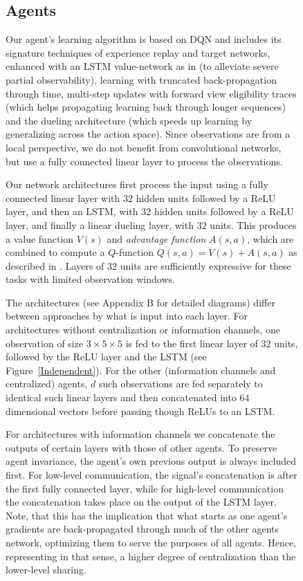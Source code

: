 \documentclass{article}
\begin{document}
\begin{figure}
\subsection{Agents}
Our agent's learning algorithm is based on DQN \citep{dqn15} and includes its signature techniques of experience replay and target networks, enhanced with an LSTM value-network as in \citet{HausknechtStoneRecurrent} (to alleviate severe partial observability), learning with truncated back-propagation through time, multi-step updates with forward view eligibility traces \citep{HarbPrecupRecurrance} (which helps propagating learning back through longer sequences) and the dueling architecture \citep{WangDuelling} (which speeds up learning by generalizing across the action space). Since observations are from a local perspective, we do not benefit from convolutional networks, but use a fully connected linear layer to process the observations. 

Our network architectures first process the input using a fully connected linear layer with $32$ hidden units followed by a ReLU layer, and then an LSTM, with $32$ hidden units followed by a ReLU layer, and finally a linear dueling layer, with $32$ units. This produces a value function $V(s)$ and \emph{advantage function} $A(s,a)$, which are combined to compute a $Q$-function $Q(s,a) = V(s) + A(s,a)$ as described in \citet{WangDuelling}. Layers of $32$ units are sufficiently expressive for these tasks with limited observation windows.

The architectures (see Appendix B for detailed diagrams) differ between approaches by what is input into each layer. For architectures without centralization or information channels, one observation of size $3\times 5\times 5$ is fed to the first linear layer of $32$ units, followed by the ReLU layer and the LSTM (see Figure~\ref{Independent}). For the other (information channels and centralized) agents, $d$ such observations are fed separately to identical such linear layers and then concatenated into $64$ dimensional vectors before passing though ReLUs to an LSTM. 

For architectures with information channels we concatenate the outputs of certain layers with those of other agents. To preserve agent invariance, the agent's own previous output is always included first. For low-level communication, the signal's concatenation is after the first fully connected layer, while for high-level communication the concatenation takes place on the output of the LSTM layer. Note, that this has the implication that what starts as one agent's gradients are back-propagated through much of the other agents network, optimizing them to serve the purposes of all agents. Hence, representing in that sense, a higher degree of centralization than the lower-level sharing.


\end{figure}
\end{document}
